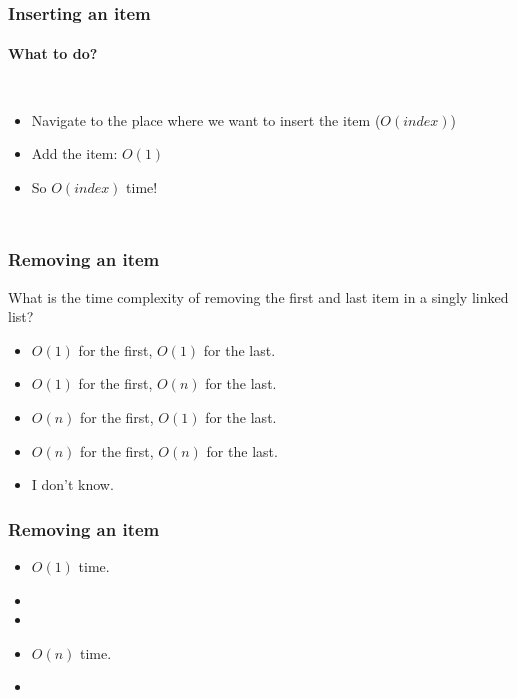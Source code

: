 \begin{frame}
	\frametitle{Inserting an item}
	\framesubtitle{What to do?}
	\begin{columns}
	\begin{itemize}
		\item Navigate to the place where we want to insert the item ($O(\textit{index})$)
			
		\item Add the item: $O(1)$
			
		\item So $O(\textit{index})$ time!
	\end{itemize}
			
		
	
			
	\end{columns}
\end{frame}

\begin{frame}
	\frametitle{Removing an item}

		What is the time complexity of removing the first and last item in a singly linked list?

		\begin{itemize}
			\item $O(1)$ for the first, $O(1)$ for the last.
			\item $O(1)$ for the first, $O(n)$ for the last.
			\item $O(n)$ for the first, $O(1)$ for the last.
			\item $O(n)$ for the first, $O(n)$ for the last.
			\item I don't know.
		\end{itemize}


\end{frame}

\begin{frame}
	\frametitle{Removing an item}


		\begin{itemize}
			\item $O(1)$ time.
			
			\item 

		\item 
		
			\item $O(n)$ time.

			\item 
	\end{itemize}

\end{frame}

